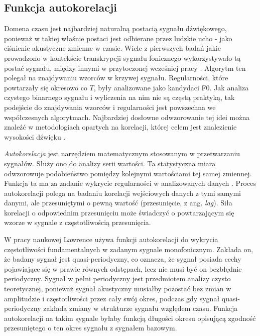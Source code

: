 \documentclass[12pt,a4paper,twoside]{mwart}
\begin{document}
\subsection{Funkcja autokorelacji}\label{sec:f0:ac}
Domena czasu jest najbardziej naturalną postacią sygnału dźwiękowego, ponieważ w takiej właśnie postaci jest odbierane przez ludzkie ucho - jako ciśnienie akustyczne zmienne w czasie. Wiele z pierwszych badań jakie prowadzono w kontekście transkrypcji sygnału fonicznego wykorzystywało tą postać sygnału, między innymi w przytoczonej wcześniej pracy \cite{Transcription:Gold:ComputerProgramForPitchExtraction}. Algorytm ten polegał na znajdywaniu wzorców w krzywej sygnału. Regularności, które powtarzały się okresowo co $T$, były analizowane jako kandydaci F0. Jak analiza czystego binarnego sygnału i wyliczenia na nim nie są częstą praktyką, tak podejście do znajdywania wzorców i regularności jest powszechna we współczesnych algorytmach. Najbardziej dosłowne odwzorowanie tej idei można znaleźć w metodologiach opartych na korelacji, której celem jest znalezienie wysokości dźwięku \cite[41-44]{Transcription:Quenneville:Thesis}.

\textit{Autokorelacja} jest narzędziem matematycznym stosowanym w przetwarzaniu sygnałów. Służy ono do analizy serii wartości. Ta statystyczna miara odwzorowuje podobieństwo pomiędzy kolejnymi wartościami tej samej zmiennej. Funkcja ta ma za zadanie wykrycie regularności w analizowanych danych \cite[32-33]{CyfrowePrzetwarzanieSygnalowOdTeoriiDoZastosowan}. Proces autokorelacji polega na badaniu korelacji wejściowych danych z tymi samymi danymi, ale przesuniętymi o pewną wartość (przesunięcie, z ang. \textit{lag}). Siła korelacji o odpowiednim przesunięciu może świadczyć o powtarzającym się wzorze w sygnale z częstotliwością przesunięcia.

W pracy naukowej \cite{Transcription:Lawrence:AutocorrelationForPitchDetection} Lawrence używa funkcji autokorelacji do wykrycia częstotliwości fundamentalnych w zadanym sygnale monofonicznym. Zakłada on, że badany sygnał jest quasi-periodyczny, co oznacza, że sygnał posiada cechy pojawiające się w prawie równych odstępach, lecz nie musi być on bezbłędnie periodyczny. Sygnał w pełni periodyczny jest przedmiotem analizy czysto teoretycznej, ponieważ sygnał akustyczny musiałby pozostać bez zmian w amplitudzie i częstotliwości przez cały swój okres, podczas gdy sygnał quasi-periodyczny zakłada zmiany w strukturze sygnału względem czasu. Funkcja autokorelacji na takim sygnale byłaby funkcją długości okresu opisującą zgodność przesuniętego o ten okres sygnału z sygnałem bazowym. 
\end{document}
